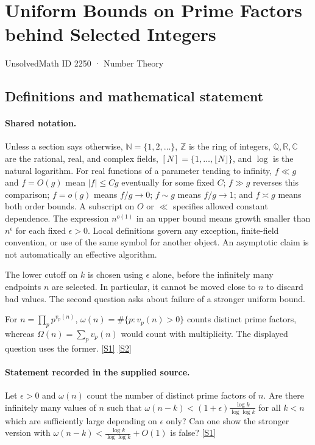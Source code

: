 \documentclass[11pt,a4paper]{article}
\newcommand{\N}{\mathbb{N}}
\newcommand{\Z}{\mathbb{Z}}
\newcommand{\Q}{\mathbb{Q}}
\newcommand{\R}{\mathbb{R}}
\newcommand{\C}{\mathbb{C}}
\newcommand{\sref}[2]{\hyperlink{source:#1:#2}{[S#2]}}
\begin{document}

\setcounter{section}{2249}

\section{Uniform Bounds on Prime Factors behind Selected Integers}\label{2250}

{\small\sffamily UnsolvedMath ID 2250 · Number Theory}

\subsection{Definitions and mathematical statement}

\paragraph{Shared notation.}Unless a section says otherwise, $\N=\{1,2,\ldots\}$,
$\Z$ is the ring of integers, $\Q,\R,\C$ are the rational, real, and complex
fields, $[N]=\{1,\ldots,\lfloor N\rfloor\}$, and $\log$ is the natural
logarithm. For real functions of a parameter tending to infinity,
$f\ll g$ and $f=O(g)$ mean $|f|\leq Cg$ eventually for some fixed $C$;
$f\gg g$ reverses this comparison; $f=o(g)$ means $f/g\to0$;
$f\sim g$ means $f/g\to1$; and $f\asymp g$ means both order bounds.
A subscript on $O$ or $\ll$ specifies allowed constant dependence.
The expression $n^{o(1)}$ in an upper bound means growth smaller than
$n^\epsilon$ for each fixed $\epsilon>0$. Local definitions govern any
exception, finite-field convention, or use of the same symbol for another
object. An asymptotic claim is not automatically an effective algorithm.



The lower cutoff on $k$ is chosen using $\epsilon$ alone, before the infinitely many endpoints $n$ are selected. In particular, it cannot be moved close to $n$ to discard bad values. The second question asks about failure of a stronger uniform bound.

For $n=\prod_pp^{v_p(n)}$, $\omega(n)=\#\{p:v_p(n)>0\}$ counts distinct prime factors, whereas $\Omega(n)=\sum_pv_p(n)$ would count with multiplicity. The displayed question uses the former. \sref{2250}{1} \sref{2250}{2}

\paragraph{Statement recorded in the supplied source.}
Let $\epsilon>0$ and $\omega(n)$ count the number of distinct prime factors of $n$. Are there infinitely many values of $n$ such that $ \omega(n-k) < (1+\epsilon)\frac{\log k}{\log\log k} $ for all $k<n$ which are sufficiently large depending on $\epsilon$ only?
Can one show the stronger version with $ \omega(n-k) < \frac{\log k}{\log\log k}+O(1) $ is false? \sref{2250}{1}
\end{document}
